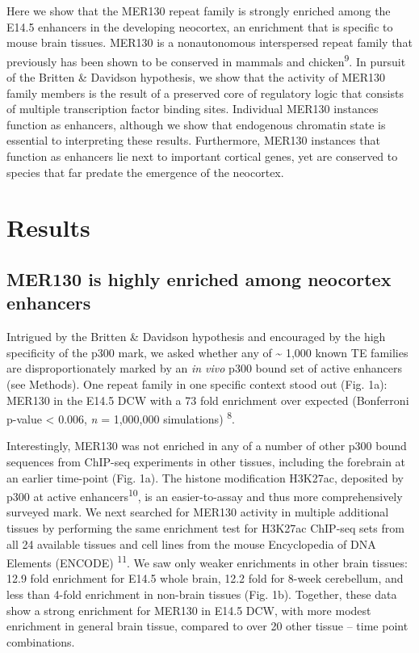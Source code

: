 \documentclass[]{article}
\begin{document}
Here we show that the MER130 repeat family is strongly enriched among
the E14.5 enhancers in the developing neocortex, an enrichment that is
specific to mouse brain tissues. MER130 is a nonautonomous interspersed
repeat family that previously has been shown to be conserved in mammals
and chicken\textsuperscript{9}. In pursuit of the Britten \& Davidson
hypothesis, we show that the activity of MER130 family members is the
result of a preserved core of regulatory logic that consists of multiple
transcription factor binding sites. Individual MER130 instances function
as enhancers, although we show that endogenous chromatin state is
essential to interpreting these results. Furthermore, MER130 instances
that function as enhancers lie next to important cortical genes, yet are
conserved to species that far predate the emergence of the neocortex.

\section{Results}\label{results}

\subsection{MER130 is highly enriched among neocortex
enhancers}\label{mer130-is-highly-enriched-among-neocortex-enhancers}

Intrigued by the Britten \& Davidson hypothesis and encouraged by the
high specificity of the p300 mark, we asked whether any of
\textasciitilde{} 1,000 known TE families are disproportionately marked
by an \emph{in vivo} p300 bound set of active enhancers (see Methods).
One repeat family in one specific context stood out (Fig. 1a): MER130 in
the E14.5 DCW with a 73 fold enrichment over expected (Bonferroni
p-value \textless{} 0.006, \emph{n} = 1,000,000 simulations)
\textsuperscript{8}.

Interestingly, MER130 was not enriched in any of a number of other p300
bound sequences from ChIP-seq experiments in other tissues, including
the forebrain at an earlier time-point (Fig. 1a). The histone
modification H3K27ac, deposited by p300 at active
enhancers\textsuperscript{10}, is an easier-to-assay and thus more
comprehensively surveyed mark. We next searched for MER130 activity in
multiple additional tissues by performing the same enrichment test for
H3K27ac ChIP-seq sets from all 24 available tissues and cell lines from
the mouse Encyclopedia of DNA Elements (ENCODE) \textsuperscript{11}. We
saw only weaker enrichments in other brain tissues: 12.9 fold enrichment
for E14.5 whole brain, 12.2 fold for 8-week cerebellum, and less than
4-fold enrichment in non-brain tissues (Fig. 1b). Together, these data
show a strong enrichment for MER130 in E14.5 DCW, with more modest
enrichment in general brain tissue, compared to over 20 other tissue --
time point combinations.
\end{document}
